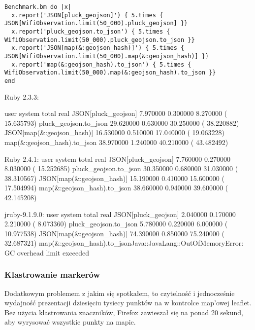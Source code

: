 \begin{lstlisting}[caption=Benchmark geojson]
Benchmark.bm do |x|
  x.report('JSON[pluck_geojson]') { 5.times { JSON[WifiObservation.limit(50_000).pluck_geojson] }}
  x.report('pluck_geojson.to_json') { 5.times {  WifiObservation.limit(50_000).pluck_geojson.to_json }}
  x.report('JSON[map(&:geojson_hash)]') { 5.times {  JSON[WifiObservation.limit(50_000).map(&:geojson_hash)] }}
  x.report('map(&:geojson_hash).to_json') { 5.times {  WifiObservation.limit(50_000).map(&:geojson_hash).to_json }}
end
\end{lstlisting}

Ruby 2.3.3:

       user     system      total        real
JSON[pluck_geojson]  7.970000   0.300000   8.270000 ( 15.635793)
pluck_geojson.to_json 29.620000   0.630000  30.250000 ( 38.220882)
JSON[map(&:geojson_hash)] 16.530000   0.510000  17.040000 ( 19.063228)
map(&:geojson_hash).to_json 38.970000   1.240000  40.210000 ( 43.482492)

Ruby 2.4.1:
       user     system      total        real
JSON[pluck_geojson]  7.760000   0.270000   8.030000 ( 15.252685)
pluck_geojson.to_json 30.350000   0.680000  31.030000 ( 38.310567)
JSON[map(&:geojson_hash)] 15.190000   0.410000  15.600000 ( 17.504994)
map(&:geojson_hash).to_json 38.660000   0.940000  39.600000 ( 42.145208)

jruby-9.1.9.0:
       user     system      total        real
JSON[pluck_geojson]  2.040000   0.170000   2.210000 (  8.073360)
pluck_geojson.to_json  5.780000   0.220000   6.000000 ( 10.977538)
JSON[map(&:geojson_hash)] 74.390000   0.850000  75.240000 ( 32.687321)
map(&:geojson_hash).to_jsonJava::JavaLang::OutOfMemoryError: GC overhead limit exceeded


\subsubsection{Klastrowanie markerów}

Dodatkowym problemem z jakim się spotkałem, to czytelność i jednocześnie wydajność prezentacji dziesięciu tysiecy punktów na w kontrolce map'owej leaflet. Bez użycia klastrowania znaczników, Firefox zawieszał się na ponad 20 sekund, aby wyrysować wszystkie punkty na mapie.



